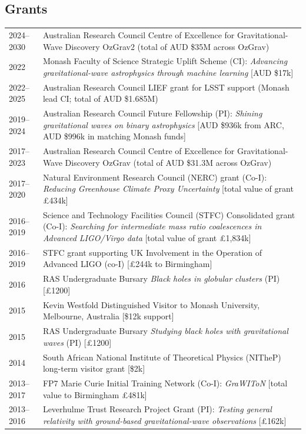 \documentclass[margin,line]{res}
\begin{document}
\begin{resume}
\section{\sc Grants}
\begin{tabular}{@{}p{0.8in}p{4.7in}}
2024--2030 & Australian Research Council Centre of Excellence for Gravitational-Wave Discovery OzGrav2 (total of AUD \$35M across OzGrav)\\
2022 & Monash Faculty of Science Strategic Uplift Scheme (CI): {\it Advancing gravitational-wave astrophysics through machine learning} [AUD \$17k]\\
2022--2025 &  Australian Research Council LIEF grant for LSST support (Monash lead CI; total of AUD \$1.685M)\\
2019--2024 & Australian Research Council Future Fellowship (PI): {\it  Shining gravitational waves on binary astrophysics} [AUD \$936k from ARC, AUD \$996k in matching Monash funds]\\
2017--2023 & Australian Research Council Centre of Excellence for Gravitational-Wave Discovery OzGrav (total of AUD \$31.3M across OzGrav)\\
2017--2020 & Natural Environment Research Council (NERC) grant (Co-I): {\it Reducing Greenhouse Climate Proxy Uncertainty} [total value of grant \pounds 434k]\\
2016--2019 & Science and Technology Facilities Council (STFC) Consolidated grant (Co-I): {\it Searching for intermediate mass ratio coalescences in Advanced LIGO/Virgo data} [total value of grant \pounds1,834k]\\
2016--2019 & STFC grant supporting UK Involvement in the Operation of Advanced LIGO (co-I) [\pounds 244k to Birmingham]\\
2016 & RAS Undergraduate Bursary {\it Black holes in globular clusters} (PI) [\pounds 1200]\\
2015 & Kevin Westfold Distinguished Visitor to Monash University, Melbourne, Australia [\$12k support]\\
2015 & RAS Undergraduate Bursary {\it Studying black holes with gravitational waves} (PI) [\pounds 1200]\\
2014 & South African National Institute of Theoretical Physics (NITheP) long-term visitor grant [\$2k]\\
2013--2017 & FP7 Marie Curie Initial Training Network (Co-I): {\it GraWIToN} [total value to Birmingham \pounds 481k]\\
2013--2016 & Leverhulme Trust Research Project Grant (PI): {\it Testing general relativity with ground-based gravitational-wave observations} [\pounds162k]\\

\end{tabular}
\end{resume}
\end{document}
